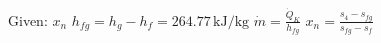 Given: \( x_n \)  
\( h_{fg} = h_g - h_f = 264.77 \, \text{kJ/kg} \)  
\( \dot{m} = \frac{\dot{Q}_K}{h_{fg}} \)  
\( x_n = \frac{s_4 - s_{fg}}{s_{fg} - s_f} \)